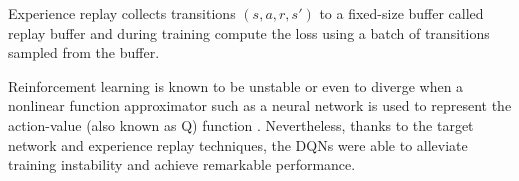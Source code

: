 Experience replay collects transitions $(s, a, r, s')$ to a fixed-size buffer called replay buffer and during training 
compute the loss using a batch of transitions sampled from the buffer.

Reinforcement learning is known to be unstable or even to diverge
when a nonlinear function approximator such as a neural network is
used to represent the action-value (also known as Q) function
\cite{mnih2015human}.
%
Nevertheless, thanks to the target network and experience replay techniques, the DQNs were able to alleviate training instability and achieve remarkable performance.
